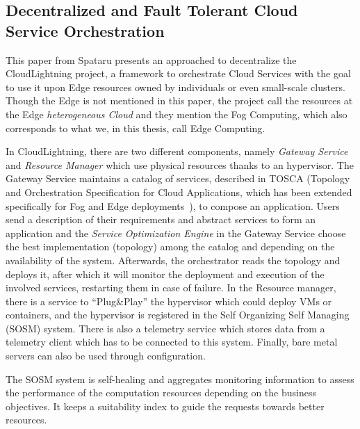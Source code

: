 
\subsection{Decentralized and Fault Tolerant Cloud Service
  Orchestration~\cite{Spataru20}}
\label{subsec:spataru20}

This paper from Spataru presents an approached to decentralize the
CloudLightning project, a framework to orchestrate Cloud Services with
the goal to use it upon Edge resources owned by individuals or even
small-scale clusters.
%
Though the Edge is not mentioned in this paper, the project call the
resources at the Edge \emph{heterogeneous Cloud} and they mention the
Fog Computing, which also corresponds to what we, in this thesis, call
Edge Computing.

In CloudLightning, there are two different components, namely
\emph{Gateway Service} and \emph{Resource Manager} which use physical
resources thanks to an hypervisor.
%
The Gateway Service maintains a catalog of services, described in
TOSCA (Topology and Orchestration Specification for Cloud
Applications, which has been extended specifically for Fog and Edge
deployments~\cite{TVCAM21}), to compose an application.
%
Users send a description of their requirements and abstract services
to form an application and the \emph{Service Optimization Engine} in
the Gateway Service choose the best implementation (topology) among
the catalog and depending on the availability of the system.
%
Afterwards, the orchestrator reads the topology and deploys it, after
which it will monitor the deployment and execution of the involved
services, restarting them in case of failure.
%
In the Resource manager, there is a service to ``Plug\&Play'' the
hypervisor which could deploy VMs or containers, and the hypervisor is
registered in the Self Organizing Self Managing (SOSM) system.
%
There is also a telemetry service which stores data from a telemetry
client which has to be connected to this system.
%
Finally, bare metal servers can also be used through configuration.

The SOSM system is self-healing and aggregates monitoring information
to assess the performance of the computation resources depending on
the business objectives. It keeps a suitability index to guide the
requests towards better resources.

